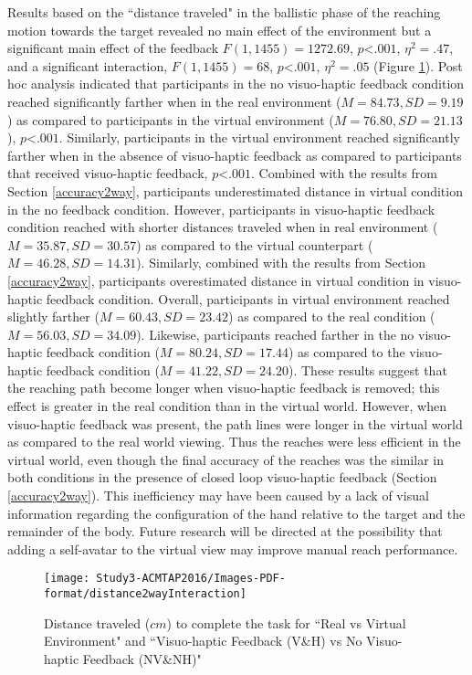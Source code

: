 Results based on the ``distance traveled" in the ballistic phase of the reaching motion towards the target revealed no main effect of the environment but a significant main effect of the feedback $F(1,1455)=1272.69$, $p$\textless$.001$, $\eta^{2}=.47$, and a significant interaction, $F(1,1455)=68$, $p$\textless$.001$, $\eta^{2}=.05$ (Figure \ref{fig:distance2way}). Post hoc analysis indicated that participants in the no visuo-haptic feedback condition reached significantly farther when in the real environment ($M=84.73, SD=9.19$) as compared to participants in the virtual environment ($M=76.80, SD=21.13$), $p$\textless$.001$. Similarly, participants in the virtual environment reached significantly farther when in the absence of visuo-haptic feedback as compared to participants that received visuo-haptic feedback, $p$\textless$.001$. Combined with the results from Section \ref{accuracy2way}, participants underestimated distance in virtual condition in the no feedback condition. However, participants in visuo-haptic feedback condition reached with shorter distances traveled when in real environment ($M=35.87, SD=30.57$) as compared to the virtual counterpart ($M=46.28, SD=14.31$). Similarly, combined with the results from Section \ref{accuracy2way}, participants overestimated distance in virtual condition in visuo-haptic feedback condition. Overall, participants in virtual environment reached slightly farther ($M=60.43, SD=23.42$) as compared to the real condition ($M=56.03, SD=34.09$). Likewise, participants reached farther in the no visuo-haptic feedback condition ($M=80.24, SD=17.44$) as compared to the visuo-haptic feedback condition ($M=41.22, SD=24.20$). These results suggest that the reaching path become longer when visuo-haptic feedback is removed; this effect is greater in the real condition than in the virtual world. However, when visuo-haptic feedback was present, the path lines were longer in the virtual world as compared to the real world viewing. Thus the reaches were less efficient in the virtual world, even though the final accuracy of the reaches was the similar in both conditions in the presence of closed loop visuo-haptic feedback (Section \ref{accuracy2way}). This inefficiency may have been caused by a lack of visual information regarding the configuration of the hand relative to the target and the remainder of the body. Future research will be directed at the possibility that adding a self-avatar to the virtual view may improve manual reach performance.


\begin{figure}
	\centering
	\texttt{[image: Study3-ACMTAP2016/Images-PDF-format/distance2wayInteraction]}
	\caption{Distance traveled ($cm$) to complete the task for ``Real vs Virtual Environment" and ``Visuo-haptic Feedback (V\&H) vs No Visuo-haptic Feedback (NV\&NH)"}
	\label{fig:distance2way}
\end{figure}

